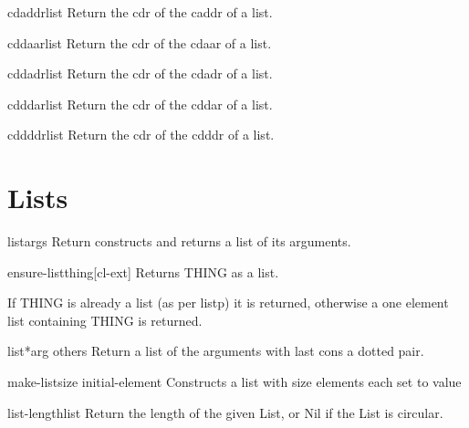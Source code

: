 \documentclass[10pt,english]{book}
\begin{document}
\begin{accessor}{cdaddr}{list}
  Return the cdr of the caddr of a list.
\end{accessor}

\begin{accessor}{cddaar}{list}
  Return the cdr of the cdaar of a list.
\end{accessor}

\begin{accessor}{cddadr}{list}
  Return the cdr of the cdadr of a list.
\end{accessor}

\begin{accessor}{cdddar}{list}
  Return the cdr of the cddar of a list.
\end{accessor}

\begin{accessor}{cddddr}{list}
  Return the cdr of the cdddr of a list.
\end{accessor}

\section{Lists}
\label{sec:lists}

\begin{function}{list}{\rest args}
  Return constructs and returns a list of its arguments.
\end{function}

\begin{function}{ensure-list}{thing}[cl-ext]
  Returns THING as a list.

If THING is already a list (as per listp) it is returned,
otherwise a one element list containing THING is returned.
\end{function}

\begin{function}{list*}{arg \rest others}
  Return a list of the arguments with last cons a dotted pair.
\end{function}

\begin{function}{make-list}{size \key initial-element}
  Constructs a list with size elements each set to value
\end{function}

\begin{function}{list-length}{list}
  Return the length of the given List, or Nil if the List is circular.
\end{function}
\end{document}
